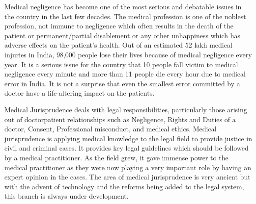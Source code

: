 \setcounter{figure}{0}
\setcounter{table}{0}
\setcounter{footnote}{0}

\label{2018-art7}

\begin{multicols}{2}


\vspace{-.1cm}

\noi
Medical negligence has become one of the most serious and debatable issues in the country in the
last few decades. The medical profession is one of the noblest profession, not immune to
negligence which often results in the death of the patient or permanent/partial disablement or any
other unhappiness which has adverse effects on the patient’s health. Out of an estimated 52 lakh
medical injuries in India, 98,000 people lose their lives because of medical negligence every year.
It is a serious issue for the country that 10 people fall victim to medical negligence every minute
and more than 11 people die every hour due to medical error in India. It is not a surprise that even
the smallest error committed by a doctor have a life-altering impact on the patients.

\vspace{-.1cm}

\noi
Medical Jurisprudence deals with legal responsibilities, particularly those arising out of doctorpatient relationships such as Negligence, Rights and Duties of a doctor, Consent, Professional
misconduct, and medical ethics. Medical jurisprudence is applying medical knowledge to the
legal field to provide justice in civil and criminal cases. It provides key legal guidelines which
should be followed by a medical practitioner. As the field grew, it gave immense power to the
medical practitioner as they were now playing a very important role by having an expert opinion
in the cases. The area of medical jurisprudence is very ancient but with the advent of technology
and the reforms being added to the legal system, this branch is always under development.

\vspace{-.1cm}


\end{multicols}
